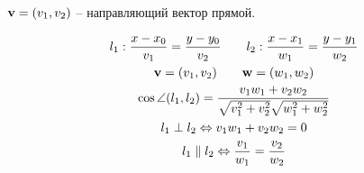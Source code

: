 \documentclass[main]{subfiles}
\begin{document}
\begin{definition}
    $\mathbf{v} = (v_1, v_2)$ -- направляющий вектор прямой.
\end{definition}
\begin{definition}
    \begin{gather*}
        l_1: \frac{x-x_0}{v_1}=\frac{y-y_0}{v_2} \qquad l_2: \frac{x-x_1}{w_1} = \frac{y-y_1}{w_2}\\
        \mathbf{v} = (v_1, v_2) \qquad \mathbf{w} = (w_1, w_2)\\
        \cos \angle(l_1, l_2) = \frac{v_1 w_1 + v_2 w_2}{\sqrt{v_1^2 + v_2^2}\sqrt{w_1^2 + w_2^2}}\\
        l_1 \perp l_2 \Leftrightarrow v_1 w_1 + v_2 w_2 = 0\\
        l_1 \parallel l_2 \Leftrightarrow \frac{v_1}{w_1} = \frac{v_2}{w_2}
    \end{gather*}
\end{definition}
\end{document}
